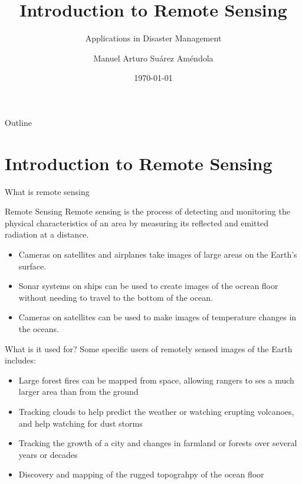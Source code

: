 \documentclass[10pt]{beamer}
\title{Introduction to Remote Sensing}
\subtitle{Applications in Disaster Management}
\author{Manuel Arturo Suárez Améndola}
\date{\today}
\begin{document}
\begin{frame}
    \titlepage
\end{frame}

\begin{frame}{Outline}
    \tableofcontents
\end{frame}

\section{Introduction to Remote Sensing}
\begin{frame}{What is remote sensing}
  \begin{block}{Remote Sensing}
    Remote sensing is the process of detecting and monitoring the physical characteristics of an area
    by measuring its reflected and emitted radiation at a distance.
  \end{block}
    \begin{itemize}
        \item Cameras on satellites and airplanes take images of large areas on the Earth's surface.
        \item Sonar systems on ships can be used to create images of the ocrean floor without needing to travel to the bottom of the ocean.
        \item Cameras on satellites can be used to make images of temperature changes in the oceans.
    \end{itemize}
\end{frame}

\begin{frame}{What is it used for?}
  Some specific users of remotely sensed images of the Earth includes:

  \begin{itemize}
    \item Large forest fires can be mapped from space, allowing rangers to ses a much larger area than from the ground
    \item Tracking clouds to help predict the weather or watching erupting volcanoes, and help watching for dust storms
    \item Tracking the growth of a city and changes in farmland or forests over several years or decades
    \item Discovery and mapping of the rugged topograhpy of the ocean floor
  \end{itemize}
\end{frame}
\end{document}

